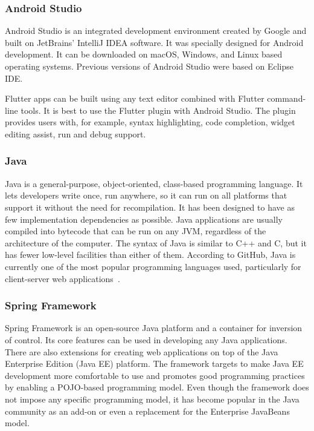\subsubsection{Android Studio}
Android Studio is an integrated development environment created by Google and built on JetBrains' IntelliJ IDEA software. It was specially designed for Android development. It can be downloaded on macOS, Windows, and Linux based operating systems. Previous versions of Android Studio were based on Eclipse IDE.~\cite{android-studio}

Flutter apps can be built using any text editor combined with Flutter command-line tools. It is best to use the Flutter plugin with Android Studio. The plugin provides users with, for example, syntax highlighting, code completion, widget editing assist, run and debug support.

\subsubsection{Java}
Java is a general-purpose, object-oriented, class-based programming language. It lets developers write once, run anywhere, so it can run on all platforms that support it without the need for recompilation.  It has been designed to have as few implementation dependencies as possible. Java applications are usually compiled into bytecode that can be run on any JVM, regardless of the architecture of the computer. The syntax of Java is similar to C++ and C, but it has fewer low-level facilities than either of them. According to GitHub, Java is currently one of the most popular programming languages used, particularly for client-server web applications~\cite{java}.

\subsubsection{Spring Framework}
Spring Framework is an open-source Java platform and a container for inversion of control. Its core features can be used in developing any Java applications. There are also extensions for creating web applications on top of the Java Enterprise Edition (Java EE) platform. The framework targets to make Java EE development more comfortable to use and promotes good programming practices by enabling a POJO-based programming model. Even though the framework does not impose any specific programming model, it has become popular in the Java community as an add-on or even a replacement for the Enterprise JavaBeans model.~\cite{spring}

